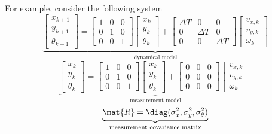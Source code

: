 For example, consider the following system
\begin{equation*}
  \underbrace{
    \begin{bmatrix}
      x_{k+1} \\
      y_{k+1} \\
      \theta_{k+1}
    \end{bmatrix} =
    \begin{bmatrix}
      1 & 0 & 0 \\
      0 & 1 & 0 \\
      0 & 0 & 1
    \end{bmatrix}
    \begin{bmatrix}
      x_k \\
      y_k \\
      \theta_k
    \end{bmatrix} +
    \begin{bmatrix}
      \Delta T & 0 & 0 \\
      0 & \Delta T & 0 \\
      0 & 0 & \Delta T
    \end{bmatrix}
    \begin{bmatrix}
      v_{x,k} \\
      v_{y,k} \\
      \omega_k
    \end{bmatrix}
  }_{\text{dynamical model}}
\end{equation*}
\begin{equation*}
  \underbrace{
    \begin{bmatrix}
      x_k \\
      y_k \\
      \theta_k
    \end{bmatrix} =
    \begin{bmatrix}
      1 & 0 & 0 \\
      0 & 1 & 0 \\
      0 & 0 & 1
    \end{bmatrix}
    \begin{bmatrix}
      x_k \\
      y_k \\
      \theta_k
    \end{bmatrix} +
    \begin{bmatrix}
      0 & 0 & 0 \\
      0 & 0 & 0 \\
      0 & 0 & 0
    \end{bmatrix}
    \begin{bmatrix}
      v_{x,k} \\
      v_{y,k} \\
      \omega_k
    \end{bmatrix}
  }_{\text{measurement model}}
\end{equation*}
\begin{equation*}
  \underbrace{
    \mat{R} = \diag(\sigma_x^2, \sigma_y^2, \sigma_\theta^2)
  }_{\text{measurement covariance matrix}}
\end{equation*}

